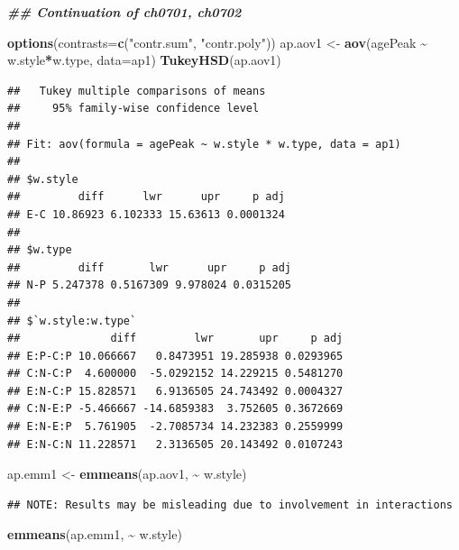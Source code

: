 \documentclass[
]{book}
\newenvironment{Shaded}{\begin{snugshade}}{\end{snugshade}}
\newcommand{\AttributeTok}[1]{\textcolor[rgb]{0.13,0.29,0.53}{#1}}
\newcommand{\DocumentationTok}[1]{\textcolor[rgb]{0.56,0.35,0.01}{\textbf{\textit{#1}}}}
\newcommand{\FunctionTok}[1]{\textcolor[rgb]{0.13,0.29,0.53}{\textbf{#1}}}
\newcommand{\NormalTok}[1]{#1}
\newcommand{\OtherTok}[1]{\textcolor[rgb]{0.56,0.35,0.01}{#1}}
\newcommand{\SpecialCharTok}[1]{\textcolor[rgb]{0.81,0.36,0.00}{\textbf{#1}}}
\newcommand{\StringTok}[1]{\textcolor[rgb]{0.31,0.60,0.02}{#1}}
\begin{document}
\begin{Shaded}
\begin{Highlighting}[]
\DocumentationTok{\#\# Continuation of ch0701, ch0702}

\FunctionTok{options}\NormalTok{(}\AttributeTok{contrasts=}\FunctionTok{c}\NormalTok{(}\StringTok{"contr.sum"}\NormalTok{, }\StringTok{"contr.poly"}\NormalTok{))}
\NormalTok{ap.aov1 }\OtherTok{\textless{}{-}} \FunctionTok{aov}\NormalTok{(agePeak }\SpecialCharTok{\textasciitilde{}}\NormalTok{ w.style}\SpecialCharTok{*}\NormalTok{w.type, }\AttributeTok{data=}\NormalTok{ap1)}
\FunctionTok{TukeyHSD}\NormalTok{(ap.aov1)}
\end{Highlighting}
\end{Shaded}

\begin{verbatim}
##   Tukey multiple comparisons of means
##     95% family-wise confidence level
## 
## Fit: aov(formula = agePeak ~ w.style * w.type, data = ap1)
## 
## $w.style
##         diff      lwr      upr     p adj
## E-C 10.86923 6.102333 15.63613 0.0001324
## 
## $w.type
##         diff       lwr      upr     p adj
## N-P 5.247378 0.5167309 9.978024 0.0315205
## 
## $`w.style:w.type`
##              diff         lwr       upr     p adj
## E:P-C:P 10.066667   0.8473951 19.285938 0.0293965
## C:N-C:P  4.600000  -5.0292152 14.229215 0.5481270
## E:N-C:P 15.828571   6.9136505 24.743492 0.0004327
## C:N-E:P -5.466667 -14.6859383  3.752605 0.3672669
## E:N-E:P  5.761905  -2.7085734 14.232383 0.2559999
## E:N-C:N 11.228571   2.3136505 20.143492 0.0107243
\end{verbatim}

\begin{Shaded}
\begin{Highlighting}[]
\NormalTok{ap.emm1 }\OtherTok{\textless{}{-}} \FunctionTok{emmeans}\NormalTok{(ap.aov1, }\SpecialCharTok{\textasciitilde{}}\NormalTok{ w.style)}
\end{Highlighting}
\end{Shaded}

\begin{verbatim}
## NOTE: Results may be misleading due to involvement in interactions
\end{verbatim}

\begin{Shaded}
\begin{Highlighting}[]
\FunctionTok{emmeans}\NormalTok{(ap.emm1, }\SpecialCharTok{\textasciitilde{}}\NormalTok{ w.style)}
\end{Highlighting}
\end{Shaded}
\end{document}
